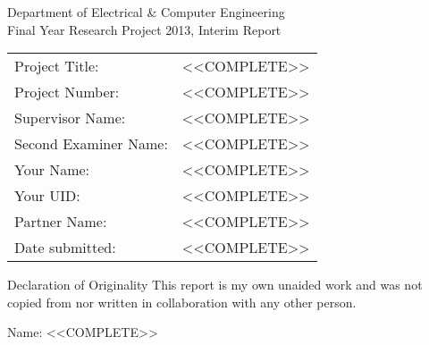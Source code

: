 \begin{titlepage}
{%
{
\Large
Department of Electrical \& Computer Engineering \\
Final Year Research Project 2013, Interim Report}
}
\newline
\newline
\newline

\begin{table*}[h]
\begin{tabular}{ll}
Project Title: & <<COMPLETE>> \\
Project Number: & <<COMPLETE>> \\
Supervisor Name: & <<COMPLETE>> \\
Second Examiner Name: & <<COMPLETE>> \\
Your Name: & <<COMPLETE>> \\
Your UID: & <<COMPLETE>> \\
Partner Name: & <<COMPLETE>>  \\
Date submitted: & <<COMPLETE>> \\

\end{tabular}
\end{table*}
\begin{table}


\end{table}
\pagebreak
{\Large Declaration of Originality}
\newline
\newline
\newline
This report is my own unaided work and was not copied from 
nor written in collaboration with any other person.

Name: <<COMPLETE>> 


\end{titlepage}


